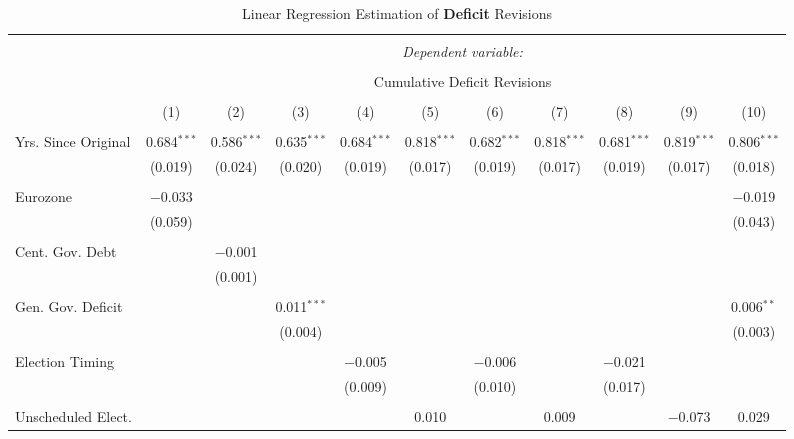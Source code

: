 
\begin{table}[!htbp] \centering 
  \caption{Linear Regression Estimation of \textbf{Deficit} Revisions} 
  \label{deficit_results} 
\tiny 
\begin{tabular}{@{\extracolsep{5pt}}lcccccccccc} 
\\[-1.8ex]\hline 
\hline \\[-1.8ex] 
 & \multicolumn{10}{c}{\textit{Dependent variable:}} \\ 
\cline{2-11} 
\\[-1.8ex] & \multicolumn{10}{c}{Cumulative Deficit Revisions} \\ 
\\[-1.8ex] & (1) & (2) & (3) & (4) & (5) & (6) & (7) & (8) & (9) & (10)\\ 
\hline \\[-1.8ex] 
 Yrs. Since Original & 0.684$^{***}$ & 0.586$^{***}$ & 0.635$^{***}$ & 0.684$^{***}$ & 0.818$^{***}$ & 0.682$^{***}$ & 0.818$^{***}$ & 0.681$^{***}$ & 0.819$^{***}$ & 0.806$^{***}$ \\ 
  & (0.019) & (0.024) & (0.020) & (0.019) & (0.017) & (0.019) & (0.017) & (0.019) & (0.017) & (0.018) \\ 
  & & & & & & & & & & \\ 
 Eurozone & $-$0.033 &  &  &  &  &  &  &  &  & $-$0.019 \\ 
  & (0.059) &  &  &  &  &  &  &  &  & (0.043) \\ 
  & & & & & & & & & & \\ 
 Cent. Gov. Debt &  & $-$0.001 &  &  &  &  &  &  &  &  \\ 
  &  & (0.001) &  &  &  &  &  &  &  &  \\ 
  & & & & & & & & & & \\ 
 Gen. Gov. Deficit &  &  & 0.011$^{***}$ &  &  &  &  &  &  & 0.006$^{**}$ \\ 
  &  &  & (0.004) &  &  &  &  &  &  & (0.003) \\ 
  & & & & & & & & & & \\ 
 Election Timing &  &  &  & $-$0.005 &  & $-$0.006 &  & $-$0.021 &  &  \\ 
  &  &  &  & (0.009) &  & (0.010) &  & (0.017) &  &  \\ 
  & & & & & & & & & & \\ 
 Unscheduled Elect. &  &  &  &  & 0.010 &  & 0.009 &  & $-$0.073 & 0.029 \\ 

\end{tabular}
\end{table}
